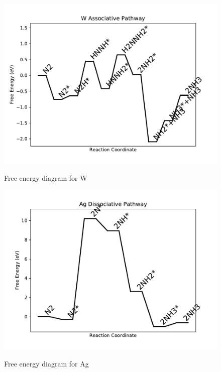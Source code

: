 \documentclass[journal=jacsat,manuscript=article]{achemso}
\begin{document}
\begin{figure}
\includegraphics[width=1\linewidth]{data/plots/W_associative.pdf}
\label{fig:W_associative}
\caption{Free energy diagram for W}
\end{figure}

\newpage
\begin{figure}
\includegraphics[width=1\linewidth]{data/plots/Ag_dissociative.pdf}
\label{fig:Ag_dissociative}
\caption{Free energy diagram for Ag}
\end{figure}
\end{document}
